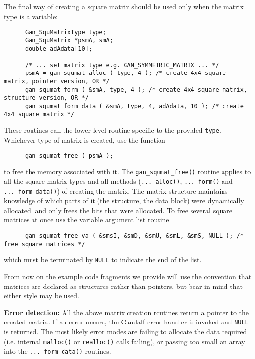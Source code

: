 The final way of creating a square matrix should be used only when the
matrix type is a variable:
\begin{verbatim}
      Gan_SquMatrixType type;
      Gan_SquMatrix *psmA, smA;
      double adAdata[10];

      /* ... set matrix type e.g. GAN_SYMMETRIC_MATRIX ... */
      psmA = gan_squmat_alloc ( type, 4 ); /* create 4x4 square matrix, pointer version, OR */
      gan_squmat_form ( &smA, type, 4 ); /* create 4x4 square matrix, structure version, OR */
      gan_squmat_form_data ( &smA, type, 4, adAdata, 10 ); /* create 4x4 square matrix */
\end{verbatim}
These routines call the lower level routine specific to the provided
{\tt type}. Whichever type of matrix is created, use the function
\begin{verbatim}
      gan_squmat_free ( psmA );
\end{verbatim}
to free the memory associated with it.
The {\tt gan\_squmat\_free()} routine applies to all the square matrix types
and all methods ({\tt ...\_alloc()}, {\tt ...\_form()} and
{\tt ...\_form\_data()}) of creating the matrix. The matrix structure maintains
knowledge of which parts of it (the structure, the data block) were
dynamically allocated, and only frees the bits that were allocated.
To free several square matrices at once use the variable argument
list routine
\begin{verbatim}
      gan_squmat_free_va ( &smsI, &smD, &smU, &smL, &smS, NULL ); /* free square matrices */
\end{verbatim}
which must be terminated by {\tt NULL} to indicate the end of the list.

From now on the example code fragments we provide will use the convention
that matrices are declared as structures rather than pointers, but bear in
mind that either style may be used.

{\bf Error detection:} All the above matrix creation routines
return a pointer to the created matrix. If an error occurs,
the Gandalf error handler is invoked and {\tt NULL}
is returned. The most likely error modes are failing
to allocate the data required (i.e. internal {\tt malloc()} or {\tt realloc()}
calls failing), or passing too small an array into the
{\tt ...\_form\_data()} routines.

